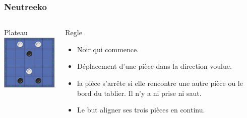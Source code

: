 \documentclass[11pt]{beamer}
\begin{document}
\begin{frame}

\frametitle{Neutreeko}
\subtitle{Neutreeko}
\begin{columns}[t]
\begin{column}{3cm}
	\begin{block}{Plateau}
	\centering \includegraphics[width=80pt]{images/neut.jpg}
	\end{block} 
\end{column}

\begin{column}{7cm}
	\begin{block}{Regle}
		\begin{itemize}
			\item Noir qui commence. 
			\item Déplacement d'une  pièce dans la direction voulue.
			
			\item la pièce s'arrête si elle rencontre une autre pièce ou le bord du tablier. Il n'y a ni prise ni saut.
			
			\item Le but aligner ses trois pièces en continu.
		\end{itemize}
	\end{block}   
\end{column}
\end{columns}  
\end{frame}
%
%
%
%
%
   
\end{document}
